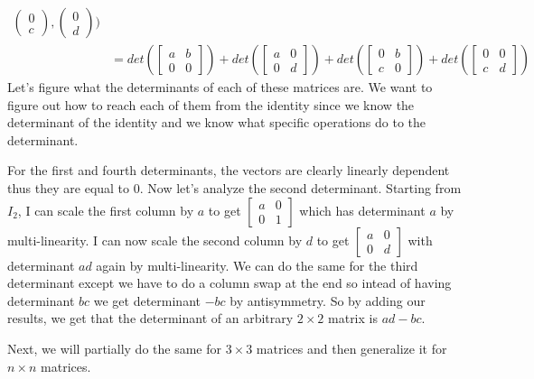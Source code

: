 \begin{example}
\begin{align*}
\begin{pmatrix}
        0 \\ c
    \end{pmatrix}, \begin{pmatrix}
        0 \\ d
    \end{pmatrix})\tag{by Multilinearity}\\
    &=det(\begin{bmatrix}
        a & b \\
        0 & 0
    \end{bmatrix})+det(\begin{bmatrix}
        a & 0 \\
        0 & d
    \end{bmatrix})+det(\begin{bmatrix}
        0 & b \\
        c & 0
    \end{bmatrix})+det(\begin{bmatrix}
        0 & 0 \\
        c & d
    \end{bmatrix})
    \end{align*}
    Let's figure what the determinants of each of these matrices are. We want to figure out how to reach each of them from the identity since we know the determinant of the identity and we know what specific operations do to the determinant. 

    For the first and fourth determinants, the vectors are clearly linearly dependent thus they are equal to $0$. Now let's analyze the second determinant. Starting from $I_2$, I can scale the first column by $a$ to get $\begin{bmatrix}
        a & 0 \\ 0 & 1
    \end{bmatrix}$ which has determinant $a$ by multi-linearity. I can now scale the second column by $d$ to get $\begin{bmatrix}
        a & 0 \\ 0 & d
    \end{bmatrix}$ with determinant $ad$ again by multi-linearity. We can do the same for the third determinant except we have to do a column swap at the end so intead of having determinant $bc$ we get determinant $-bc$ by antisymmetry. So by adding our results, we get that the determinant of an arbitrary $2\times 2$ matrix is $ad-bc$.
\end{example}
Next, we will partially do the same for $3\times 3$ matrices and then generalize it for $n\times n$ matrices.
